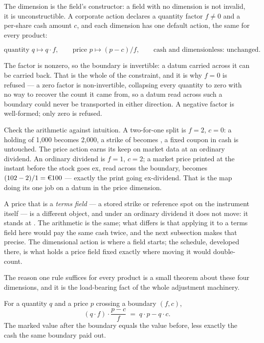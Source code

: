 The dimension is the field's constructor: a field with no dimension is not
invalid, it is unconstructible. A corporate action declares a quantity factor
$f \neq 0$ and a per-share cash amount $c$, and each dimension has one default action,
the same for every product:

\[
  \text{quantity } q \mapsto q \cdot f, \qquad
  \text{price } p \mapsto (p - c)/f, \qquad
  \text{cash and dimensionless: unchanged.}
\]

The factor is nonzero, so the boundary is invertible: a datum carried across it
can be carried back. That is the whole of the constraint, and it is why $f = 0$ is
refused --- a zero factor is non-invertible, collapsing every quantity to zero with
no way to recover the count it came from, so a datum read across such a boundary
could never be transported in either direction. A negative factor is well-formed;
only zero is refused.

Check the arithmetic against intuition. A two-for-one split is $f = 2$, $c = 0$: a
holding of 1{,}000 becomes 2{,}000, a strike of  becomes , a fixed
coupon in cash is untouched. The price action earns its keep on market data at an
ordinary dividend. An ordinary  dividend is $f = 1$, $c = 2$; a market price
printed at  the instant before the stock goes ex, read across the
boundary, becomes $(102 - 2)/1 = \EUR{100}$ --- exactly the print going
ex-dividend. That is the map doing its one job on a datum in the price dimension.

A price that is a \emph{terms field} --- a stored strike or reference spot on the
instrument itself --- is a different object, and under an ordinary dividend it does
not move: it stands at . The arithmetic is the same; what differs is that
applying it to a terms field here would pay the same cash twice, and the next
subsection makes that precise. The dimensional action is where a field starts; the
schedule, developed there, is what holds a price field fixed exactly where moving
it would double-count.

The reason one rule suffices for every product is a small theorem about these four
dimensions, and it is the load-bearing fact of the whole adjustment machinery.

\begin{theorem}\label{thm:dim-invariance}
For a quantity $q$ and a price $p$ crossing a boundary $(f, c)$,
\[
  (q \cdot f)\cdot\frac{p - c}{f} \;=\; q\cdot p - q\cdot c .
\]
The marked value after the boundary equals the value before, less exactly the cash
the same boundary paid out.
\end{theorem}

